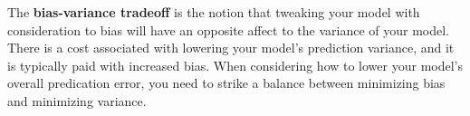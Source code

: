 \documentclass[11pt]{article}
\begin{document}
\vspace{5 mm}
\noindent
The {\bf bias-variance tradeoff} is the notion that tweaking your model with
consideration to bias will have an opposite affect to the variance of your
model. There is a cost associated with lowering your model's prediction
variance, and it is typically paid with increased bias. When considering how to
lower your model's overall predication error, you need to strike a balance
between minimizing bias and minimizing variance.
\end{document}
